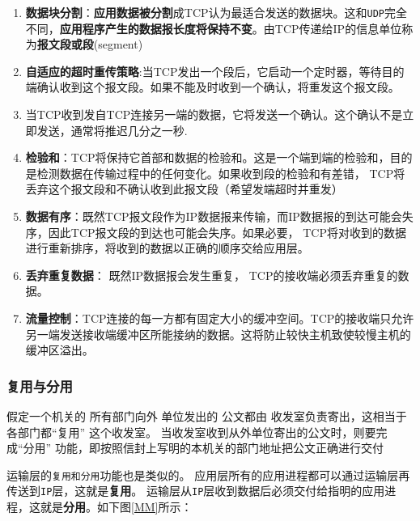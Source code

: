\documentclass[UTF8,a4paper,12pt]{ctexbook}
\begin{document}
				\begin{enumerate}
					\item \textbf{数据块分割}：\textbf{应用数据被分割}成TCP认为最适合发送的数据块。这和\verb|UDP|完全不同，\textbf{应用程序产生的数据报长度将保持不变}。由TCP传递给IP的信息单位称为\textbf{报文段或段}(segment)
					
					\item \textbf{自适应的超时重传策略}:当TCP发出一个段后，它启动一个定时器，等待目的端确认收到这个报文段。如果不能及时收到一个确认，将重发这个报文段。
					
					\item 当TCP收到发自TCP连接另一端的数据，它将发送一个确认。这个确认不是立即发送，通常将推迟几分之一秒.
					
					\item \textbf{检验和}：TCP将保持它首部和数据的检验和。这是一个端到端的检验和，目的是检测数据在传输过程中的任何变化。如果收到段的检验和有差错， TCP将丢弃这个报文段和不确认收到此报文段（希望发端超时并重发）
					
					\item \textbf{数据有序}：既然TCP报文段作为IP数据报来传输，而IP数据报的到达可能会失序，因此TCP报文段的到达也可能会失序。如果必要， TCP将对收到的数据进行重新排序，将收到的数据以正确的顺序交给应用层。
					
					\item \textbf{丢弃重复数据}： 既然IP数据报会发生重复， TCP的接收端必须丢弃重复的数据。
					
					\item \textbf{流量控制}：TCP连接的每一方都有固定大小的缓冲空间。TCP的接收端只允许另一端发送接收端缓冲区所能接纳的数据。这将防止较快主机致使较慢主机的缓冲区溢出。
				\end{enumerate}
				
			\subsubsection{复用与分用}
				假定一个机关的 所有部门向外 单位发出的 公文都由 收发室负责寄出，这相当于各部门都“复用” 这个收发室。 当收发室收到从外单位寄出的公文时，则要完成“分用” 功能，即按照信封上写明的本机关的部门地址把公文正确进行交付
				
				运输层的\verb|复用和分用|功能也是类似的。 应用层所有的应用进程都可以通过运输层再传送到\verb|IP|层，这就是\textbf{复用}。 运输层从\verb|IP|层收到数据后必须交付给指明的应用进程，这就是\textbf{分用}。如下图\ref{MM}所示：
				
\end{document}
